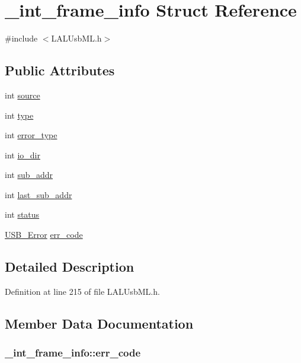 \hypertarget{struct__int__frame__info}{
\section{\_\-int\_\-frame\_\-info Struct Reference}
\label{struct__int__frame__info}
}


{\ttfamily \#include $<$LALUsbML.h$>$}\subsection*{Public Attributes}
\begin{DoxyCompactItemize}
\item 
int \hyperlink{struct__int__frame__info_aa1ce450da20558e8f163ad2fe94549a0}{source}
\item 
int \hyperlink{struct__int__frame__info_a4c4c7c961ca654d25894f2712acf8082}{type}
\item 
int \hyperlink{struct__int__frame__info_a1bec0ff5f853c91d7c1f942a313b3f04}{error\_\-type}
\item 
int \hyperlink{struct__int__frame__info_a25159adc4e751e8a9bb755171b256545}{io\_\-dir}
\item 
int \hyperlink{struct__int__frame__info_a97675d320269c758fdb640e1a935af66}{sub\_\-addr}
\item 
int \hyperlink{struct__int__frame__info_a939d145888f1c2264e2e980c07412efb}{last\_\-sub\_\-addr}
\item 
int \hyperlink{struct__int__frame__info_a0d9006b1b5b9fd5a5576e1cdb7e88c5b}{status}
\item 
\hyperlink{LALUsb_8h_aa7e5a2302774d5aa1d48a2a1cfc46e86}{USB\_\-Error} \hyperlink{struct__int__frame__info_a43e1a7c19fbc0d16e21dd9cb58f686e2}{err\_\-code}
\end{DoxyCompactItemize}


\subsection{Detailed Description}


Definition at line 215 of file LALUsbML.h.

\subsection{Member Data Documentation}
\hypertarget{struct__int__frame__info_a43e1a7c19fbc0d16e21dd9cb58f686e2}{
\subsubsection[{err\_\-code}]{ {\bf \_\-int\_\-frame\_\-info::err\_\-code}}}
\label{struct__int__frame__info_a43e1a7c19fbc0d16e21dd9cb58f686e2}


